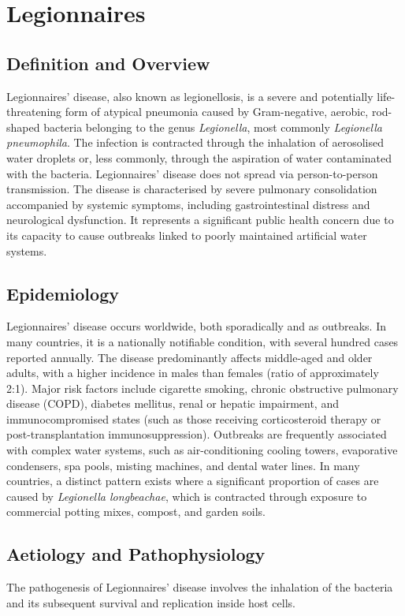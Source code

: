 \chapter{Legionnaires}

\section*{Definition and Overview}
Legionnaires' disease, also known as legionellosis, is a severe and potentially life-threatening form of atypical pneumonia caused by Gram-negative, aerobic, rod-shaped bacteria belonging to the genus \textit{Legionella}, most commonly \textit{Legionella pneumophila}. The infection is contracted through the inhalation of aerosolised water droplets or, less commonly, through the aspiration of water contaminated with the bacteria. Legionnaires' disease does not spread via person-to-person transmission. The disease is characterised by severe pulmonary consolidation accompanied by systemic symptoms, including gastrointestinal distress and neurological dysfunction. It represents a significant public health concern due to its capacity to cause outbreaks linked to poorly maintained artificial water systems.

\section*{Epidemiology}
Legionnaires' disease occurs worldwide, both sporadically and as outbreaks. In many countries, it is a nationally notifiable condition, with several hundred cases reported annually. The disease predominantly affects middle-aged and older adults, with a higher incidence in males than females (ratio of approximately 2:1). Major risk factors include cigarette smoking, chronic obstructive pulmonary disease (COPD), diabetes mellitus, renal or hepatic impairment, and immunocompromised states (such as those receiving corticosteroid therapy or post-transplantation immunosuppression). Outbreaks are frequently associated with complex water systems, such as air-conditioning cooling towers, evaporative condensers, spa pools, misting machines, and dental water lines. In many countries, a distinct pattern exists where a significant proportion of cases are caused by \textit{Legionella longbeachae}, which is contracted through exposure to commercial potting mixes, compost, and garden soils.

\section*{Aetiology and Pathophysiology}
The pathogenesis of Legionnaires' disease involves the inhalation of the bacteria and its subsequent survival and replication inside host cells.

